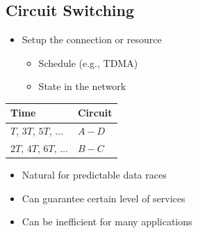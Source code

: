 \subsection{Circuit Switching}
\begin{itemize}[nosep]
    \item Setup the connection or resource
          \begin{itemize}[nosep]
              \item Schedule (e.g., TDMA)
              \item State in the network
          \end{itemize}
\end{itemize}
\begin{multicols}{2}
    \begin{figure}[H]
    \end{figure}

    \begin{table}[H]
        \begin{tabular}{l l}
            Time                      & Circuit \\\toprule
            $T$, $3T$, $5T$, $\dots$  & $A - D$ \\
            $2T$, $4T$, $6T$, $\dots$ & $B - C$
        \end{tabular}
    \end{table}
\end{multicols}
\begin{itemize}[nosep]
    \item Natural for predictable data races
    \item Can guarantee certain level of services
    \item Can be inefficient for many applications
\end{itemize}
